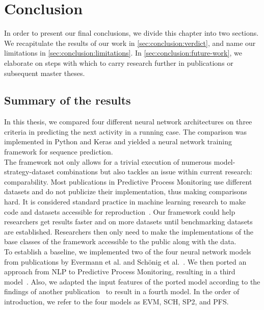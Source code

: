 \chapter{Conclusion} \label{chap:conclusion}
In order to present our final conclusions, we divide this chapter into two sections.
We recapitulate the results of our work in \autoref{sec:conclusion:verdict}, and name our limitations in \autoref{sec:conclusion:limitations}.
In \autoref{sec:conclusion:future-work}, we elaborate on steps with which to carry research further in publications or subsequent master theses.

\section{Summary of the results} \label{sec:conclusion:verdict}
In this thesis, we compared four different neural network architectures on three criteria in predicting the next activity in a running case. The comparison was implemented in Python and Keras and yielded a neural network training framework for sequence prediction.\\

The framework not only allows for a trivial execution of numerous model-strategy-dataset combinations but also tackles an issue within current research: comparability.
Most publications in Predictive Process Monitoring use different datasets and do not publicize their implementation, thus making comparisons hard.
It is considered standard practice in machine learning research to make code and datasets accessible for reproduction~\cite{russell1995modern}.
Our framework could help researchers get results faster and on more datasets until benchmarking datasets are established.
Researchers then only need to make the implementations of the base classes of the framework accessible to the public along with the data.\\

To establish a baseline, we implemented two of the four neural network models from publications by Evermann et al. and Schönig et al.~\cite{evermann2016, schoenig2018}.
We then ported an approach from NLP to Predictive Process Monitoring, resulting in a third model~\cite{shibata2016bipartite}.
Also, we adapted the input features of the ported model according to the findings of another publication~\cite{klinkmuller2018reliablemonitoring} to result in a fourth model.
In the order of introduction, we refer to the four models as EVM, SCH, SP2, and PFS.


